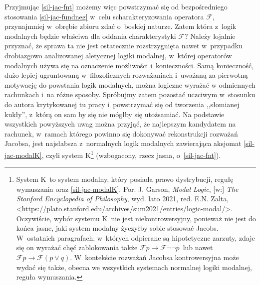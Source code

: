 Przyjmując \ref{sil-jac-fnt} możemy więc powstrzymać się od bezpośredniego stosowania \eqref{sil-jac-fundneg} w~celu scharakteryzowania operatora $\mathscr{F}$, przynajmniej w~obrębie zbioru zdać o~boskiej naturze. Zatem która z~logik modalnych będzie właściwa dla oddania charakterystyki $\mathscr{F}$? Należy lojalnie przyznać, że sprawa ta nie jest ostatecznie rozstrzygnięta nawet w~przypadku drobiazgowo analizowanej aletycznej logiki modalnej, w~której operatorów modalnych używa się na oznaczenie możliwości i~konieczności. Samą konieczność, dużo lepiej ugruntowaną w~filozoficznych rozważaniach i~uważaną za pierwotną motywację do powstania logik modalnych, można logiczne wyrażać w odmiennych rachunkach i~na różne sposoby. Spróbujmy zatem pozostać uczciwym w~stosunku do autora krytykowanej tu pracy i~powstrzymać się od tworzenia ,,słomianej kukły'', z~którą on sam by się nie mógłby się utożsamiać. Na podstawie wszystkich powyższych uwag można przyjąć, że najlepszym kandydatem na rachunek, w~ramach którego powinno się dokonywać rekonstrukcji rozważań Jacobsa, jest najsłabsza z~normalnych logik modalnych zawierająca aksjomat \eqref{sil-jac-modalK}, czyli system K\footnote{System K~to system modalny, który posiada prawo dystrybucji, regułę wymuszania oraz \ref{sil-jac-modalK}. Por. J. Garson, \textit{Modal Logic}, [w:] \textit{The Stanford Encyclopedia of Philosophy}, wyd. lato 2021, red. E.N. Zalta, {\textless}\url{https://plato.stanford.edu/archives/sum2021/entries/logic-modal/}{\textgreater}. Oczywiście, wybór systemu K~nie jest niekontrowersyjny, ponieważ nie jest do końca jasne, jaki system modalny życzyłby sobie stosować Jacobs. W~ostatnich paragrafach, w~których odpierane są hipotetyczne zarzuty, zdaje się on wyrażać chęć zablokowania także $ \mathscr{F} p \to \mathscr{F} \neg \neg p$~lub nawet $ \mathscr{F} p \to \mathscr{F} (p \lor q)$. W~kontekście rozważań Jacobsa kontrowersyjna może wydać się także, obecna we wszystkich systemach normalnej logiki modalnej, reguła wymuszania.} (wzbogacony, rzecz jasna, o~\ref{sil-jac-fnt}).

